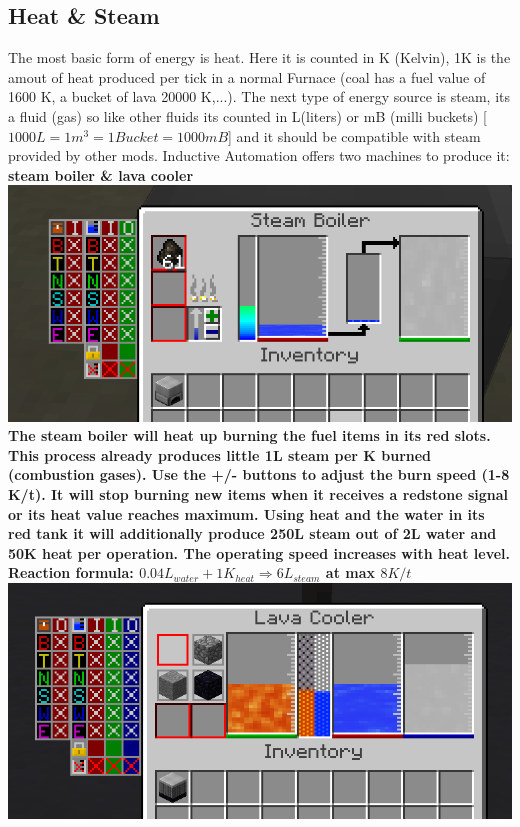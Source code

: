 \documentclass[11pt]{article} %
\begin{document}
\subsection{Heat \& Steam}
The most basic form of energy is heat. Here it is counted in K (Kelvin), 1K is the amout of heat produced per tick in a normal Furnace (coal has a fuel value of 1600 K, a bucket of lava 20000 K,...). The next type of energy source is steam, its a fluid (gas) so like other fluids its counted in L(liters) or mB (milli buckets) [$1000L = 1m^3 = 1Bucket = 1000mB$] and it should be compatible with steam provided by other mods. Inductive Automation offers two machines to produce it: \bf steam boiler \rm \& \bf lava cooler \rm \\
\includegraphics[width = \textwidth]{steamBoiler}
The steam boiler will heat up burning the fuel items in its red slots. This process already produces little 1L steam per K burned (combustion gases). Use the +/- buttons to adjust the burn speed (1-8 K/t). It will stop burning new items when it receives a redstone signal or its heat value reaches maximum. Using heat and the water in its red tank it will additionally produce 250L steam out of 2L water and 50K heat per operation. The operating speed increases with heat level. \\
Reaction formula: $0.04L_{water} + 1K_{heat} \Longrightarrow 6L_{steam}$ at max $8K/t$ \\
\includegraphics[width = \textwidth]{lavaCooler}
\end{document}
